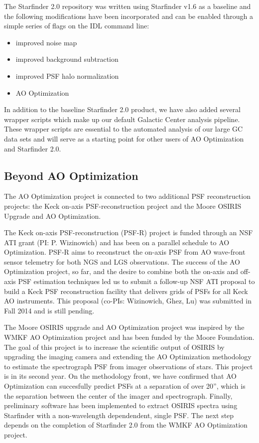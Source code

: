 The Starfinder 2.0 repository was written using Starfinder v1.6 as a
baseline and the following modifications have been incorporated and
can be enabled through a simple series of flags on the IDL command
line:
\begin{itemize}
\item improved noise map
\item improved background subtraction
\item improved PSF halo normalization
\item AO Optimization
\end{itemize}
In addition to the baseline Starfinder 2.0 product, we have also
added several wrapper scripts which make up our default Galactic
Center analysis pipeline. These wrapper scripts are essential to the
automated analysis of our large GC data sets and will serve as a
starting point for other users of AO Optimization and Starfinder 2.0.

\subsection{Beyond AO Optimization}

The AO Optimization project is connected to two additional PSF
reconstruction projects: the Keck on-axis PSF-reconstruction project
and the Moore OSIRIS Upgrade and AO Optimization. 

The Keck on-axis PSF-reconstruction (PSF-R) project is 
funded through an NSF ATI grant (PI: P. Wizinowich) and has
been on a parallel schedule to AO Optimization.  
PSF-R aims to reconstruct the on-axis PSF from AO
wave-front sensor telemetry for both NGS and LGS observations. 
The success of the AO Optimization project, so far, and the desire to
combine both the on-axis and off-axis PSF estimation techniques led us
to submit a follow-up NSF ATI proposal to build a Keck PSF
reconstruction facility that delivers grids of PSFs for all Keck AO
instruments. This proposal (co-PIs: Wizinowich, Ghez, Lu) was submitted 
in Fall 2014 and is still pending. 

The Moore OSIRIS upgrade and AO Optimization project
was inspired by the WMKF AO Optimization project and has been funded
by the Moore Foundation. 
The goal of this project is to increase the scientific output of
OSIRIS by upgrading the imaging camera and extending the AO
Optimization methodology to estimate the spectrograph PSF from imager
observations of stars. This project is in its second year.
On the methodology front, we have confirmed that AO Optimization can
succesfully predict PSFs at a separation of over 20'', which is the
separation between the center of the imager and spectrograph.
Finally, preliminary software has been implemented to extract OSIRIS
spectra using Starfinder with a non-wavelength dependendent, single
PSF. The next step depends on the completion of Starfinder 2.0 from
the WMKF AO Optimization project. 





